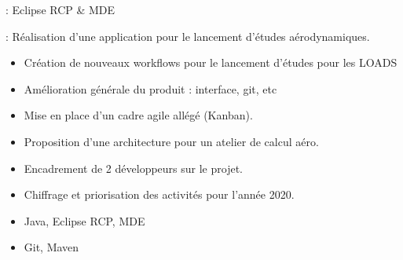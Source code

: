 
 : Eclipse RCP \& MDE

 : Réalisation d'une application pour le lancement d'études aérodynamiques.

\bigskip


\begin{itemize}
\item Création de nouveaux workflows pour le lancement d'études pour les LOADS
\item Amélioration générale du produit : interface, git, etc
\end{itemize} 


\begin{itemize}
\item Mise en place d'un cadre agile allégé (Kanban).
\item Proposition d'une architecture pour un atelier de calcul aéro.
\item Encadrement de 2 développeurs sur le projet.
\item Chiffrage et priorisation des activités pour l'année 2020.
\end{itemize} 


\begin{itemize}
\item Java, Eclipse RCP, MDE
\item Git, Maven
\end{itemize} 